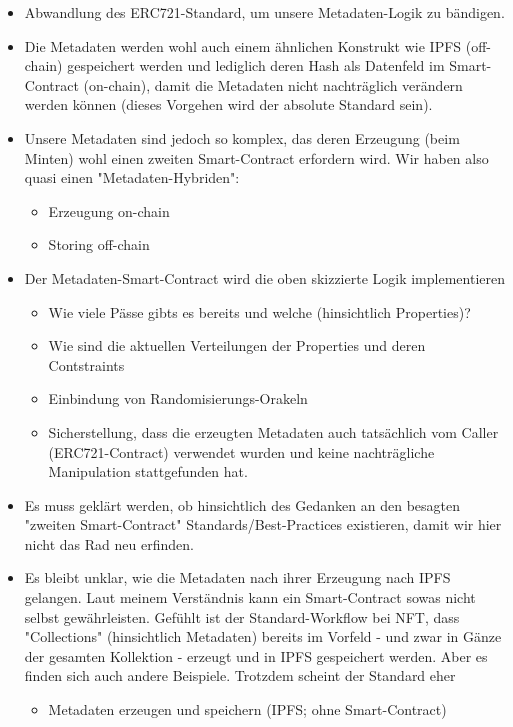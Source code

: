 \begin{itemize}
  \item Abwandlung des ERC721-Standard, um unsere Metadaten-Logik zu bändigen.
  \item Die Metadaten werden wohl auch einem ähnlichen Konstrukt wie IPFS (off-chain) gespeichert werden und lediglich deren Hash als Datenfeld im Smart-Contract (on-chain), damit die Metadaten nicht nachträglich verändern werden können (dieses Vorgehen wird der absolute Standard sein).
  \item Unsere Metadaten sind jedoch so komplex, das deren Erzeugung (beim Minten) wohl einen zweiten Smart-Contract erfordern wird. Wir haben also quasi einen "Metadaten-Hybriden":
  \begin{itemize}
  	\item Erzeugung on-chain
  	\item Storing off-chain
  \end{itemize}
  \item Der Metadaten-Smart-Contract wird die oben skizzierte Logik implementieren
  \begin{itemize}
  	\item Wie viele Pässe gibts es bereits und welche (hinsichtlich Properties)?
  	\item Wie sind die aktuellen Verteilungen der Properties und deren Contstraints
  	\item Einbindung von Randomisierungs-Orakeln
  	\item Sicherstellung, dass die erzeugten Metadaten auch tatsächlich vom Caller (ERC721-Contract) verwendet wurden und keine nachträgliche Manipulation stattgefunden hat.
  \end{itemize}
  \item Es muss geklärt werden, ob hinsichtlich des Gedanken an den besagten "zweiten Smart-Contract" Standards/Best-Practices existieren, damit wir hier nicht das Rad neu erfinden.
  \item Es bleibt unklar, wie die Metadaten nach ihrer Erzeugung nach IPFS gelangen. Laut meinem Verständnis kann ein Smart-Contract sowas nicht selbst gewährleisten. Gefühlt ist der Standard-Workflow bei NFT, dass "Collections" (hinsichtlich Metadaten) bereits im Vorfeld - und zwar in Gänze der gesamten Kollektion - erzeugt und in IPFS gespeichert werden. Aber es finden sich auch andere Beispiele. Trotzdem scheint der Standard eher 
  \begin{itemize}
  	\item Metadaten erzeugen und speichern (IPFS; ohne Smart-Contract)

\end{itemize}
\end{itemize}
